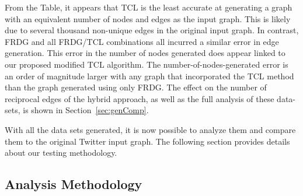 \documentclass[pdftex,11pt,a4paper,twocolumn]{scrartcl}
\begin{document}
\begin{table}[h]
\centering
{}
\caption{Comparison of Generated Graphs}
\label{table:generated}
\end{table}

From the Table, it appears that TCL is the least accurate at generating a graph with an equivalent number of nodes and edges as the input graph. This is likely due to several thousand non-unique edges in the original input graph. In contrast, FRDG and all FRDG/TCL combinations all incurred a similar error in edge generation. This error in the number of nodes generated does appear linked to our proposed modified TCL algorithm. The number-of-nodes-generated error is an order of magnitude larger with any graph that incorporated the TCL method than the graph generated using only FRDG. The effect on the number of reciprocal edges of the hybrid approach, as well as the full analysis of these data-sets, is shown in Section~\ref{sec:genComp}.   

With all the data sets generated, it is now possible to analyze them and compare them to the original Twitter input graph. The following section provides details about our testing methodology. 

\subsection{Analysis Methodology}
\end{document}
